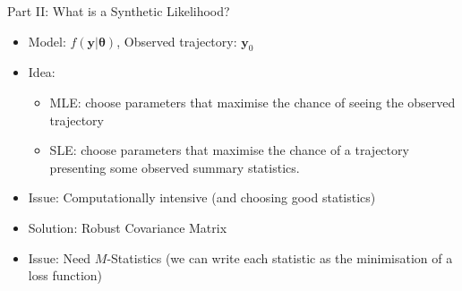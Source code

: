 \documentclass{beamer}
\begin{document}
\begin{frame}{Part II: What is a Synthetic Likelihood?}

\begin{itemize}
    \item Model: $f(\pmb{y}|\pmb{\theta})$, Observed trajectory: $\pmb{y}_0$
    \item Idea:
    \begin{itemize}
        \item MLE: choose parameters that maximise the chance of seeing the observed trajectory 
        \item SLE: choose parameters that maximise the chance of a trajectory presenting some observed summary statistics.
    \end{itemize}
    \item Issue: Computationally intensive (and choosing good statistics)
    \item Solution: Robust Covariance Matrix
    \item Issue: Need $M$-Statistics (we can write each statistic as the minimisation of a loss function)
\end{itemize}

\end{frame}
\end{document}
